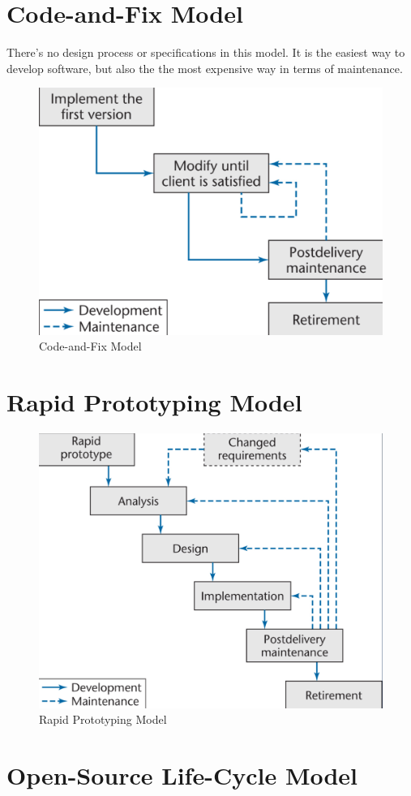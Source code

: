 \documentclass[11pt]{article}
\begin{document}
\section*{Code-and-Fix Model}

There's no design process or specifications in this model. It is the easiest way to develop software, but also the the most expensive way in terms of maintenance.

\begin{figure}[h]
	\centering
	\includegraphics[width=0.6\linewidth]{images/CodeFix.png}
	\caption{Code-and-Fix Model }
	\label{fig:CodeFix}
\end{figure}

\section*{Rapid Prototyping Model}

\begin{figure}[h]
	\centering
	\includegraphics[width=0.6\linewidth]{images/RapidPrototyping.png}
	\caption{Rapid Prototyping Model }
	\label{fig:RapidPrototyping}
\end{figure}

\section*{Open-Source Life-Cycle Model}
\end{document}
